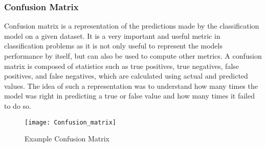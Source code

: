 \documentclass[11pt,openright]{report}
\begin{document}
\subsubsection {Confusion Matrix}
Confusion matrix is a representation of the predictions made by the classification model on a given dataset. It is a very important and useful metric in classification problems as it is not only useful to represent the models performance by itself, but can also be used to compute other metrics. A confusion matrix is composed of statistics such as true positives, true negatives, false positives, and false negatives, which are calculated using actual and predicted values. The idea of such a representation was to understand how many times the model was right in predicting a true or false value and how many times it failed to do so.

  \begin{figure}[!htbp]
	\centering
	\texttt{[image: Confusion\_matrix]}
	\caption{Example Confusion Matrix}
	\label{fig:example_confusion_matrix}
\end{figure} 
\end{document}
